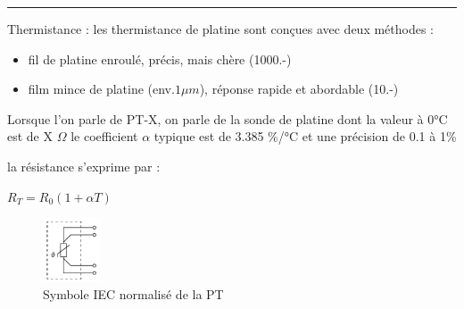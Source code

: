 \documentclass[	DIV=calc,%
							paper=a4,%
							fontsize=11pt,%
							twocolumn]{scrartcl} %
\newcommand{\hformbar}[1]{\bigskip\hrule\vspace{5pt}} %
\newcounter{mycounter}
\newcommand{\formdesc}[1]{\noindent\textbf{#1} \addtocounter{mycounter}{1} \hfill \themycounter}
\begin{document}
\hformbar

\formdesc{Capteur résistif}

Thermistance :
les thermistance de platine sont conçues avec deux méthodes : 
\begin{itemize}
    \item fil de platine enroulé, précis, mais chère (1000.-)
    \item film mince de platine (env.$1\mu m$), réponse rapide et abordable (10.-)
\end{itemize}
Lorsque l'on parle de PT-X,  on parle de la sonde de platine dont la valeur à 0°C est de X $\Omega$
le coefficient $\alpha$ typique est de 3.385 \%/°C et une précision de 0.1 à 1\%

la résistance s'exprime par :

{\hfill $R_{T} = R_0 (1+\alpha T)$ \hfill}

\begin{figure}[H]
    \begin{center}
        \includegraphics[width=0.15\textwidth]{img/PT.JPG}
        \caption{Symbole IEC normalisé de la PT}
        \label{fig:symbole_PT}
    \end{center}
\end{figure}
\end{document}
